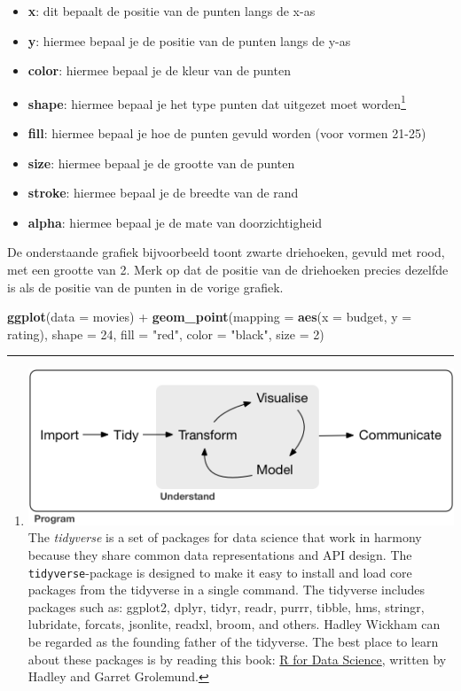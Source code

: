 \documentclass[]{tufte-book}
\newenvironment{Shaded}{}{}
\newcommand{\DataTypeTok}[1]{\textcolor[rgb]{0.56,0.13,0.00}{#1}}
\newcommand{\DecValTok}[1]{\textcolor[rgb]{0.25,0.63,0.44}{#1}}
\newcommand{\KeywordTok}[1]{\textcolor[rgb]{0.00,0.44,0.13}{\textbf{#1}}}
\newcommand{\NormalTok}[1]{#1}
\newcommand{\OperatorTok}[1]{\textcolor[rgb]{0.40,0.40,0.40}{#1}}
\newcommand{\StringTok}[1]{\textcolor[rgb]{0.25,0.44,0.63}{#1}}
\providecommand{\tightlist}{%
  \setlength{\itemsep}{0pt}\setlength{\parskip}{0pt}}
\begin{document}
\begin{itemize}
\tightlist
\item
  \textbf{x}: dit bepaalt de positie van de punten langs de x-as
\item
  \textbf{y}: hiermee bepaal je de positie van de punten langs de y-as
\item
  \textbf{color}: hiermee bepaal je de kleur van de punten
\item
  \textbf{shape}: hiermee bepaal je het type punten dat uitgezet moet worden\footnote{\includegraphics{images/tidyverse.png} The \emph{tidyverse} is a set of packages for data science that work in harmony because they share common data representations and API design. The \texttt{tidyverse}-package is designed to make it easy to install and load core packages from the tidyverse in a single command. The tidyverse includes packages such as: ggplot2, dplyr, tidyr, readr, purrr, tibble, hms, stringr, lubridate, forcats, jsonlite, readxl, broom, and others. Hadley Wickham can be regarded as the founding father of the tidyverse. The best place to learn about these packages is by reading this book: \href{http://r4ds.had.co.nz/}{R for Data Science}, written by Hadley and Garret Grolemund.}
\item
  \textbf{fill}: hiermee bepaal je hoe de punten gevuld worden (voor vormen 21-25)
\item
  \textbf{size}: hiermee bepaal je de grootte van de punten
\item
  \textbf{stroke}: hiermee bepaal je de breedte van de rand
\item
  \textbf{alpha}: hiermee bepaal je de mate van doorzichtigheid
\end{itemize}

De onderstaande grafiek bijvoorbeeld toont zwarte driehoeken, gevuld met rood, met een grootte van 2. Merk op dat de positie van de driehoeken precies dezelfde is als de positie van de punten in de vorige grafiek.

\begin{Shaded}
\begin{Highlighting}[]
\KeywordTok{ggplot}\NormalTok{(}\DataTypeTok{data =}\NormalTok{ movies) }\OperatorTok{+}
\StringTok{    }\KeywordTok{geom_point}\NormalTok{(}\DataTypeTok{mapping =} \KeywordTok{aes}\NormalTok{(}\DataTypeTok{x =}\NormalTok{ budget, }\DataTypeTok{y =}\NormalTok{ rating), }
               \DataTypeTok{shape =} \DecValTok{24}\NormalTok{, }
               \DataTypeTok{fill =} \StringTok{"red"}\NormalTok{, }
               \DataTypeTok{color =} \StringTok{"black"}\NormalTok{, }
               \DataTypeTok{size =} \DecValTok{2}\NormalTok{)}
\end{Highlighting}
\end{Shaded}
\end{document}

